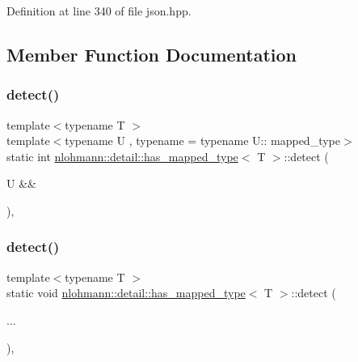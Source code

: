 Definition at line 340 of file json.\+hpp.



\subsection{Member Function Documentation}
\mbox{\label{structnlohmann_1_1detail_1_1has__mapped__type_aedb1b3019f656eb415cbe0b77d7546c4}} 
\subsubsection{\texorpdfstring{detect()}{detect()}\hspace{0.1cm}{\footnotesize\ttfamily [1/2]}}
{\footnotesize\ttfamily template$<$typename T $>$ \\
template$<$typename U , typename  = typename U\+:: mapped\+\_\+type$>$ \\
static int \hyperlink{structnlohmann_1_1detail_1_1has__mapped__type}{nlohmann\+::detail\+::has\+\_\+mapped\+\_\+type}$<$ T $>$\+::detect (\begin{DoxyParamCaption}\item[{U \&\&}]{ }\end{DoxyParamCaption})\hspace{0.3cm}{\ttfamily [static]}, {\ttfamily [private]}}

\mbox{\label{structnlohmann_1_1detail_1_1has__mapped__type_a54257c3ddcabf59a50eaad029e59b75c}} 
\subsubsection{\texorpdfstring{detect()}{detect()}\hspace{0.1cm}{\footnotesize\ttfamily [2/2]}}
{\footnotesize\ttfamily template$<$typename T $>$ \\
static void \hyperlink{structnlohmann_1_1detail_1_1has__mapped__type}{nlohmann\+::detail\+::has\+\_\+mapped\+\_\+type}$<$ T $>$\+::detect (\begin{DoxyParamCaption}\item[{}]{... }\end{DoxyParamCaption})\hspace{0.3cm}{\ttfamily [static]}, {\ttfamily [private]}}



